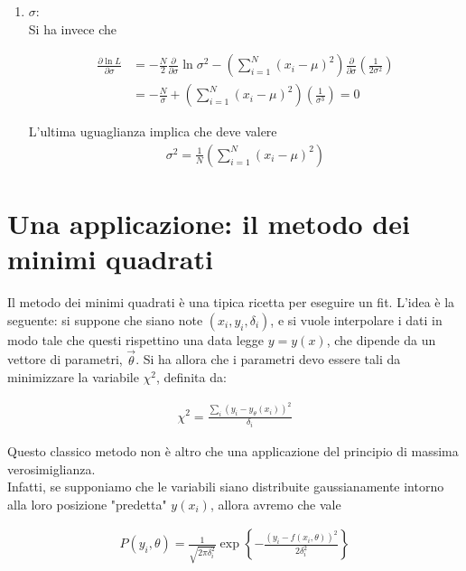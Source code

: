 \documentclass{report}
\begin{document}
{\begin{enumerate}
        Cioè abbiamo mostrato che la migliore stima di \(\mu\) è la media dei dati. 
        \item \(\sigma\): \\
        
        Si ha invece che 
    
        \begin{align}
            \frac{\partial \ln L}{\partial \sigma} &= -\frac{N}{2}\frac{\partial}{\partial \sigma}\ln \sigma^2 - \left(\sum_{i=1}^N (x_i -\mu)^2\right)\frac{\partial }{\partial \sigma}\left(\frac{1}{2\sigma^2} \right) \\
            &= -\frac{N}{\sigma} + \left(\sum_{i=1}^N (x_i -\mu)^2\right)\left(\frac{1}{\sigma^3}\right) = 0
        \end{align}

        L'ultima uguaglianza implica che deve valere
        \begin{align}
            \sigma^2 = \frac{1}{N}\left(\sum_{i=1}^N (x_i -\mu)^2\right)
        \end{align}

    \end{enumerate}
}

\section{Una applicazione: il metodo dei minimi quadrati}
    
Il metodo dei minimi quadrati è una tipica ricetta per eseguire un fit. L'idea è la seguente: si suppone che siano note \((x_i, y_i, \delta_i)\), e si vuole interpolare i dati in modo tale che questi rispettino una data legge \(y = y(x)\), che dipende da un vettore di parametri, \(\vec{\theta}\). Si ha allora che i parametri devo essere tali da minimizzare la variabile \(\chi^2\), definita da: 

\begin{align}
    \chi^2 = \frac{\sum_i (y_i - y_{\theta}(x_i))^2}{\delta_i}
\end{align}

Questo classico metodo non è altro che una applicazione del principio di massima verosimiglianza. \\

Infatti, se supponiamo che le variabili siano distribuite gaussianamente intorno alla loro posizione "predetta" \(y(x_i)\), allora avremo che vale 

\begin{align}
    P (y_i, \theta) = \frac{1}{\sqrt{2\pi\delta_i^2}}\exp\left\{-\frac{(y_i - f(x_i, \theta))^2}{2\delta_i^2}\right\}
\end{align}
\end{document}
